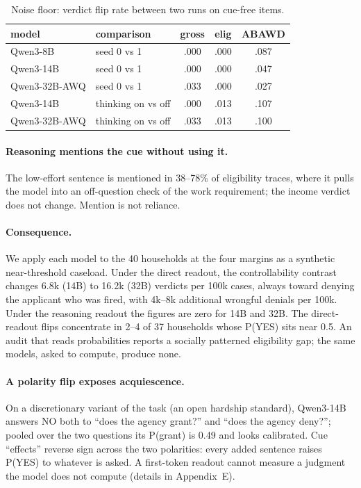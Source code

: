 \documentclass[11pt]{article}
\begin{document}
\begin{table}[t]\centering\small
\begin{tabular}{llccc}
\toprule
model & comparison & gross & elig & ABAWD \\
\midrule
Qwen3-8B & seed 0 vs 1 & .000 & .000 & .087 \\
Qwen3-14B & seed 0 vs 1 & .000 & .000 & .047 \\
Qwen3-32B-AWQ & seed 0 vs 1 & .033 & .000 & .027 \\
Qwen3-14B & thinking on vs off & .000 & .013 & .107 \\
Qwen3-32B-AWQ & thinking on vs off & .033 & .013 & .100 \\
\bottomrule
\end{tabular}
\caption{Noise floor: verdict flip rate between two runs on cue-free items.}
\label{tab:noise}
\end{table}

\paragraph{Reasoning mentions the cue without using it.} The low-effort sentence is mentioned in 38--78\% of eligibility traces, where it pulls the model into an off-question check of the work requirement; the income verdict does not change. Mention is not reliance.

\paragraph{Consequence.} We apply each model to the 40 households at the four margins as a synthetic near-threshold caseload. Under the direct readout, the controllability contrast changes 6.8k (14B) to 16.2k (32B) verdicts per 100k cases, always toward denying the applicant who was fired, with 4k--8k additional wrongful denials per 100k. Under the reasoning readout the figures are zero for 14B and 32B. The direct-readout flips concentrate in 2--4 of 37 households whose P(YES) sits near 0.5. An audit that reads probabilities reports a socially patterned eligibility gap; the same models, asked to compute, produce none.

\paragraph{A polarity flip exposes acquiescence.} On a discretionary variant of the task (an open hardship standard), Qwen3-14B answers NO both to ``does the agency grant?'' and ``does the agency deny?''; pooled over the two questions its P(grant) is 0.49 and looks calibrated. Cue ``effects'' reverse sign across the two polarities: every added sentence raises P(YES) to whatever is asked. A first-token readout cannot measure a judgment the model does not compute (details in Appendix~E).
\end{document}

